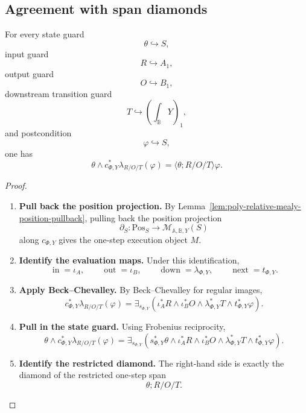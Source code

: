 \subsection{Agreement with span diamonds}
\label{subsec:poly-relative-lifting-span-agreement}

\begin{theorem}
\label{thm:poly-relative-lifting-span-agreement}
For every state guard
\[
\theta\hookrightarrow S,
\]
input guard
\[
R\hookrightarrow A_1,
\]
output guard
\[
O\hookrightarrow B_1,
\]
downstream transition guard
\[
T\hookrightarrow\left(\int_{\mathbb B}Y\right)_1,
\]
and postcondition
\[
\varphi\hookrightarrow S,
\]
one has
\[
\theta\wedge c_{\Phi,Y}^{\ast}\lambda_{R/O/T}(\varphi)
=
\langle\theta;R/O/T\rangle\varphi.
\]
\end{theorem}

\begin{proof}
\leavevmode
\begin{enumerate}
\item \textbf{Pull back the position projection.}
By Lemma~\ref{lem:poly-relative-mealy-position-pullback}, pulling back the
position projection
\[
\partial_S:\mathrm{Pos}_S\to\mathcal M_{\mathbb A,\mathbb B,Y}(S)
\]
along \(c_{\Phi,Y}\) gives the one-step execution object \(M\).

\item \textbf{Identify the evaluation maps.}
Under this identification,
\[
\operatorname{in}=\iota_A,
\qquad
\operatorname{out}=\iota_B,
\qquad
\operatorname{down}=\lambda_{\Phi,Y},
\qquad
\operatorname{next}=t_{\Phi,Y}.
\]

\item \textbf{Apply Beck--Chevalley.}
By Beck--Chevalley for regular images,
\[
c_{\Phi,Y}^{\ast}\lambda_{R/O/T}(\varphi)
=
\exists_{s_{\Phi,Y}}
\left(
\iota_A^\ast R
\wedge
\iota_B^\ast O
\wedge
\lambda_{\Phi,Y}^\ast T
\wedge
t_{\Phi,Y}^\ast\varphi
\right).
\]

\item \textbf{Pull in the state guard.}
Using Frobenius reciprocity,
\[
\theta\wedge c_{\Phi,Y}^{\ast}\lambda_{R/O/T}(\varphi)
=
\exists_{s_{\Phi,Y}}
\left(
s_{\Phi,Y}^\ast\theta
\wedge
\iota_A^\ast R
\wedge
\iota_B^\ast O
\wedge
\lambda_{\Phi,Y}^\ast T
\wedge
t_{\Phi,Y}^\ast\varphi
\right).
\]

\item \textbf{Identify the restricted diamond.}
The right-hand side is exactly the diamond of the restricted one-step span
\[
\theta;R/O/T.
\]
\end{enumerate}
\end{proof}

